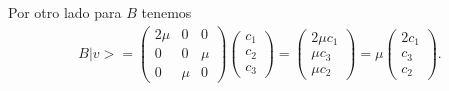 \documentclass[12pt]{exam}
\begin{document}
\begin{enumerate}
\begin{enumerate}
      Por otro lado para $B$ tenemos
      \begin{align*}
        B|v> = \begin{pmatrix} 
	  2\mu & 0 & 0 \\
	  0 & 0 & \mu\\
	  0 & \mu & 0
	\end{pmatrix}\begin{pmatrix} c_1\\ c_2 \\ c_3 \end{pmatrix} = \begin{pmatrix} 
	2\mu c_1 \\
	\mu c_3 \\
	\mu c_2
	\end{pmatrix} = \mu \begin{pmatrix} 2c_1 \\ c_3 \\ c_2 \end{pmatrix} 
      .\end{align*}
    \end{enumerate}
\end{enumerate}
\end{document}
